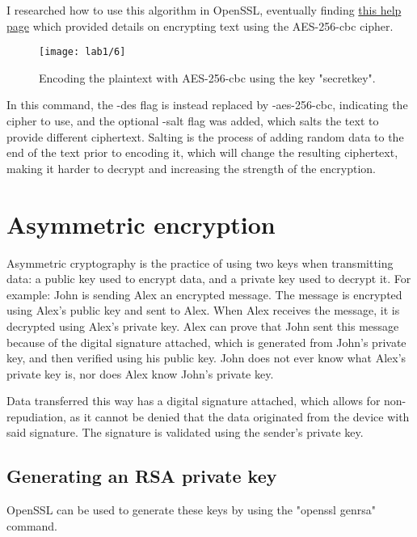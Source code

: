I researched how to use this algorithm in OpenSSL, eventually finding \href{https://www.madboa.com/geek/openssl/#how-do-i-simply-encrypt-a-file}{this help page}
\autocite{openSSLHelp} which provided details on encrypting text using the AES-256-cbc cipher.

\begin{figure}[H]
    \centering
    \texttt{[image: lab1/6]}
    \caption{Encoding the plaintext with AES-256-cbc using the key "secretkey".}
    \label{fig:AESEncrypt}
\end{figure}

In this command, the -des flag is instead replaced by -aes-256-cbc, indicating the cipher to use, and the optional
-salt flag was added, which salts the text to provide different ciphertext.
Salting is the process of adding random data to the end of the text prior to encoding it, which will change
the resulting ciphertext, making it harder to decrypt and increasing the strength of the encryption.

\pagebreak

\section{Asymmetric encryption}\label{sec:asymmEncryption}
Asymmetric cryptography is the practice of using two keys when transmitting data: a public key used to encrypt
data, and a private key used to decrypt it.
For example: John is sending Alex an encrypted message.
The message is encrypted using Alex's public key and sent to Alex.
When Alex receives the message, it is decrypted using Alex's private key.
Alex can prove that John sent this message because of the digital signature attached, which is generated
from John's private key, and then verified using his public key.
John does not ever know what Alex's private key is, nor does Alex know John's private key.

Data transferred this way has a digital signature attached, which allows for non-repudiation, as it cannot
be denied that the data originated from the device with said signature.
The signature is validated using the sender's private key. \newline


\subsection{Generating an RSA private key}\label{subsec:rsa-private-key}
OpenSSL can be used to generate these keys by using the "openssl genrsa" command.

